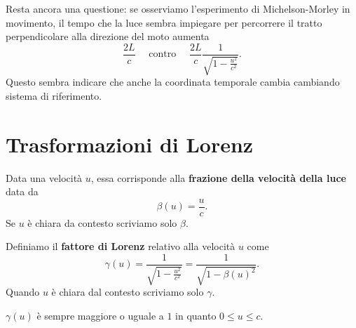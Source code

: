\setlength{\leftmargini}{0.5cm}
\noindent Resta ancora una questione: se osserviamo l'esperimento di Michelson-Morley in movimento, il tempo che la luce sembra impiegare per percorrere il tratto perpendicolare alla direzione del moto aumenta
\[\frac{2L}c \quad\text{ contro }\quad \frac{2L}c\frac1{\sqrt{1-\frac{u^2}{c^2}}}.\]
Questo sembra indicare che anche la coordinata temporale cambia cambiando sistema di riferimento. 

\section{Trasformazioni di Lorenz}
\begin{definition}
Data una velocit\`a $u$, essa corrisponde alla \textbf{frazione della velocit\`a della luce} data da
\[\beta(u)=\frac{u}c.\]
Se $u$ \`e chiara da contesto scriviamo solo $\beta$.
\end{definition}
\begin{definition}
Definiamo il \textbf{fattore di Lorenz} relativo alla velocit\`a $u$ come
\[\gamma(u)=\frac1{\sqrt{1-\frac{u^2}{c^2}}}=\frac1{\sqrt{1-\beta(u)^2}}.\]
Quando $u$ \`e chiara dal contesto scriviamo solo $\gamma$.
\end{definition}
\begin{remark}
$\gamma(u)$ \`e sempre maggiore o uguale a $1$ in quanto $0\leq u\leq c$.
\end{remark}

